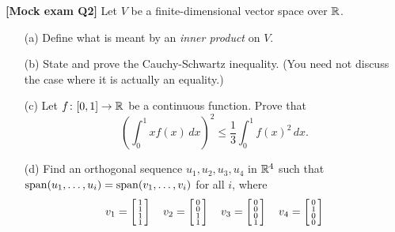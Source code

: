 \documentclass[a4paper]{article}
\begin{document}
\begin{problem}\textbf{[Mock exam Q2]}
 Let $V$ be a finite-dimensional vector space over ${\mathbb{R}}$.
 \begin{itemize}
  \item[(a)] Define what is meant by an \emph{inner product}
   on $V$.
  \item[(b)] State and prove the Cauchy-Schwartz inequality.
   (You need not discuss the case where it is actually an
   equality.) 
  \item[(c)] Let $f\colon[0,1]\to{\mathbb{R}}$ be a continuous function.
   Prove that 
   \[ \left(\textstyle \int_0^1 x f(x)\,dx\right)^2 
       \leq \frac{1}{3}\int_0^1 f(x)^2\,dx.
   \]
  \item[(d)] Find an orthogonal sequence $u_1,u_2,u_3,u_4$
   in ${\mathbb{R}}^4$ such that
   $\operatorname{span}(u_1,\dotsc,u_i)=\operatorname{span}(v_1,\dotsc,v_i)$ for all $i$,
   where
   \[ v_1 = \left[\begin{smallmatrix} 1\\1\\1\\1\end{smallmatrix}\right] \hspace{1em}
      v_2 = \left[\begin{smallmatrix} 0\\0\\1\\1\end{smallmatrix}\right] \hspace{1em}
      v_3 = \left[\begin{smallmatrix} 0\\0\\0\\1\end{smallmatrix}\right] \hspace{1em}
      v_4 = \left[\begin{smallmatrix} 0\\1\\0\\0\end{smallmatrix}\right] 
   \]
 \end{itemize}
\end{problem}
\end{document}
